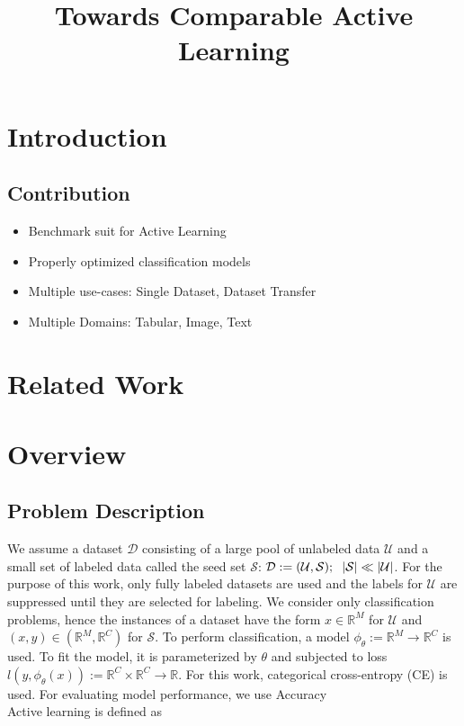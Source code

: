 \documentclass[]{article}
\title{Towards Comparable Active Learning}
\begin{document}
\maketitle

\section{Introduction}


\subsection{Contribution}
\begin{itemize}
	\item Benchmark suit for Active Learning
	\item Properly optimized classification models
	\item Multiple use-cases: Single Dataset, Dataset Transfer
	\item Multiple Domains: Tabular, Image, Text
\end{itemize}

\section{Related Work}

\section{Overview}

\subsection{Problem Description}
We assume a dataset $\mathcal{D}$ consisting of a large pool of unlabeled data $\mathcal{U}$ and a small set of labeled data called the seed set $\mathcal{S}$: $\mathcal{D} := (\mathcal{U}, \mathcal{S}); \hspace{2mm} |\mathcal{S}| \ll |\mathcal{U|}$. 
For the purpose of this work, only fully labeled datasets are used and the labels for $\mathcal{U}$ are suppressed until they are selected for labeling.
We consider only classification problems, hence the instances of a dataset have the form $x \in \mathbb{R}^M$ for $\mathcal{U}$ and $(x, y) \in (\mathbb{R}^M, \mathbb{R}^C)$ for $\mathcal{S}$.
To perform classification, a model $\phi_\theta := \mathbb{R}^M \rightarrow \mathbb{R}^C$ is used. To fit the model, it is parameterized by $\theta$ and subjected to loss $l(y, \phi_\theta(x)) := \mathbb{R}^C \times \mathbb{R}^C \rightarrow \mathbb{R}$. For this work, categorical cross-entropy (CE) is used.
For evaluating model performance, we use Accuracy \\ [1mm]
Active learning is defined as
\end{document}
